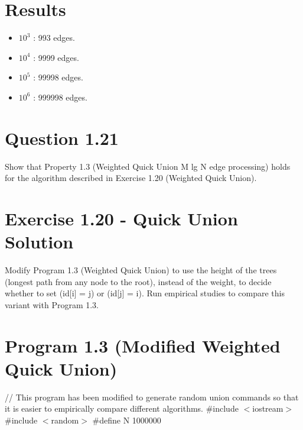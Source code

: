 \documentclass[]{article}
\begin{document}
\section*{Results}
\begin{itemize}
	\item $10^3$ : 993 edges.
	\item $10^4$ : 9999 edges.
	\item $10^5$ : 99998 edges.
	\item $10^6$ : 999998 edges.
\end{itemize}
\pagebreak

\section*{Question 1.21}
Show that Property 1.3 (Weighted Quick Union M lg N edge processing) holds for the algorithm described in Exercise 1.20 (Weighted Quick Union).

\section*{Exercise 1.20 - Quick Union Solution}
Modify Program 1.3 (Weighted Quick Union) to use the height of the trees (longest path from any node to the root), instead of the weight, to decide whether to set (id[i] = j) or (id[j] = i). Run empirical studies to compare this variant with Program 1.3.

\section*{Program 1.3 (Modified Weighted Quick Union)}
// This program has been modified to generate random union commands so that it is easier to empirically compare different algorithms.\newline\newline
\#include $<$iostream$>$\newline
\#include $<$random$>$\newline\newline
\#define N 1000000\newline
\newline
\end{document}
